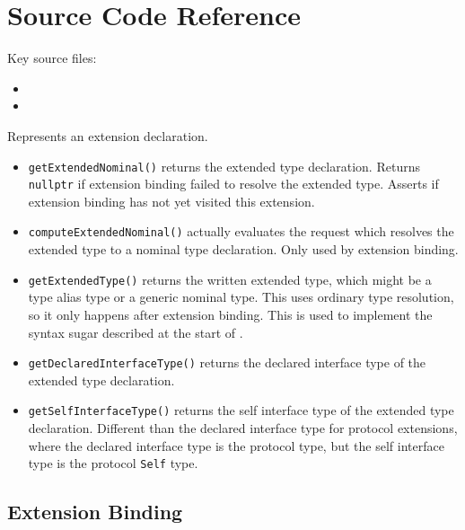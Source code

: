 \documentclass[../generics]{subfiles}
\begin{document}
\section{Source Code Reference}\label{extensionssourceref}

Key source files:
\begin{itemize}
\item {}
\item {}
\end{itemize}

Represents an extension declaration.
\begin{itemize}
\item \texttt{getExtendedNominal()} returns the extended type declaration. Returns \verb|nullptr| if extension binding failed to resolve the extended type. Asserts if extension binding has not yet visited this extension.
\item \texttt{computeExtendedNominal()} actually evaluates the request which resolves the extended type to a nominal type declaration. Only used by extension binding.
\item \texttt{getExtendedType()} returns the written extended type, which might be a type alias type or a generic nominal type. This uses ordinary type resolution, so it only happens after extension binding. This is used to implement the syntax sugar described at the start of .
\item \texttt{getDeclaredInterfaceType()} returns the declared interface type of the extended type declaration.
\item \texttt{getSelfInterfaceType()} returns the self interface type of the extended type declaration. Different than the declared interface type for protocol extensions, where the declared interface type is the protocol type, but the self interface type is the protocol \texttt{Self} type.
\end{itemize}

\subsection*{Extension Binding}
\end{document}
